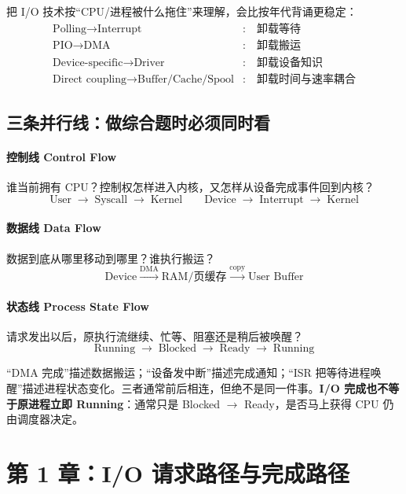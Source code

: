 \documentclass[11pt,a4paper]{ctexart}
\newcommand{\kw}[1]{\textbf{#1}}
\newcommand{\arr}{\;\longrightarrow\;}
\begin{document}
\begin{bridge}[I/O 的四次“卸载”]
把 I/O 技术按“CPU/进程被什么拖住”来理解，会比按年代背诵更稳定：
\[
\boxed{
\begin{aligned}
\text{Polling}\to\text{Interrupt} &:\quad \text{卸载等待}\\
\text{PIO}\to\text{DMA} &:\quad \text{卸载搬运}\\
\text{Device-specific}\to\text{Driver} &:\quad \text{卸载设备知识}\\
\text{Direct coupling}\to\text{Buffer/Cache/Spool} &:\quad \text{卸载时间与速率耦合}
\end{aligned}}
\]
\end{bridge}

\subsection{三条并行线：做综合题时必须同时看}

\paragraph{控制线 Control Flow}
谁当前拥有 CPU？控制权怎样进入内核，又怎样从设备完成事件回到内核？
\[
\text{User}\arr\text{Syscall}\arr\text{Kernel}\qquad
\text{Device}\arr\text{Interrupt}\arr\text{Kernel}
\]

\paragraph{数据线 Data Flow}
数据到底从哪里移动到哪里？谁执行搬运？
\[
\text{Device}\xrightarrow{\text{DMA}}\text{RAM/页缓存}
\xrightarrow{\text{copy}}\text{User Buffer}
\]

\paragraph{状态线 Process State Flow}
请求发出以后，原执行流继续、忙等、阻塞还是稍后被唤醒？
\[
\text{Running}\arr\text{Blocked}\arr\text{Ready}\arr\text{Running}
\]

\begin{warn}[三条线最常见的混淆]
“DMA 完成”描述数据搬运；“设备发中断”描述完成通知；“ISR 把等待进程唤醒”描述进程状态变化。三者通常前后相连，但绝不是同一件事。\kw{I/O 完成也不等于原进程立即 Running}：通常只是 Blocked $\to$ Ready，是否马上获得 CPU 仍由调度器决定。
\end{warn}

\section{第 1 章：I/O 请求路径与完成路径}
\end{document}
